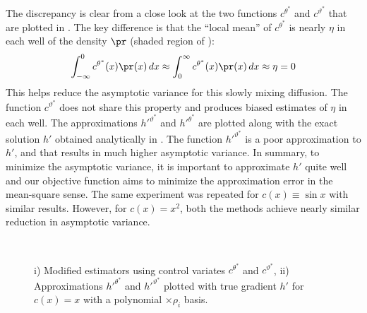 The discrepancy is clear from a close look at the two functions $c^{\theta^*}$ and $c^{\vartheta^*}$ that are plotted
in .    The key difference is that the ``local mean'' of $c^{\theta^*}$ is nearly $\eta$ in each well of the density $\pr$ (shaded region of ):
\[
\begin{aligned}
\int_{-\infty}^0 c^{\theta^*}(x) \pr(x)\, dx	
\approx
\int_0^\infty c^{\theta^*}(x) \pr(x) \, dx \approx \eta =0
\end{aligned}
\]
This helps reduce the asymptotic variance for this slowly mixing diffusion. The function $c^{\vartheta^*}$  does not share this property and produces biased estimates of $\eta$ in each well.
The approximations $h'^{\vartheta^*}$ and $h'^{\theta^*}$ are plotted along with the exact solution $h'$ obtained analytically in
.  The function $h'^{\vartheta^*}$ is a poor approximation to $h'$,  and that results in much higher asymptotic variance. In summary, to minimize the asymptotic variance, it is  important to approximate $h'$ quite well and our objective function aims to minimize the approximation error in the mean-square sense. The same experiment was repeated for $c(x) \equiv\sin x$ with similar results. However, for $c(x) = x^2$, both the methods achieve nearly similar reduction in asymptotic variance. 

\begin{figure}[htbp]
	\centering
	\mbox{
		 \quad
	}
	\caption{i) Modified estimators using control variates $c^{\theta^*}$ and $c^{\vartheta^*}$, ii) Approximations $h'^{\theta^*}$ and $h'^{\vartheta^*}$ plotted with true gradient $h'$ for $c(x) =x$ with a polynomial $\times \rho_i$ basis.}
	\label{fig:mcmc_cv_theta_var}
\end{figure}


